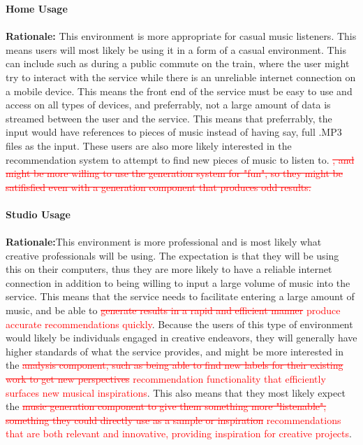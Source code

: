 \documentclass[12pt]{article}
\begin{document}
\textbf{Home Usage}\\
\\\textbf{Rationale:} This environment is more appropriate for casual music listeners. 
This means users will most likely be using it in a form of a casual environment. This can 
include such as during a public commute on the train, where the user might try to interact 
with the service while there is an unreliable internet connection on a mobile device. This
means the front end of the service must be easy to use and access on all types of devices, 
and preferrably, not a large amount of data is streamed between the user and the service. 
This means that preferrably, the input would have references to pieces of music instead of 
having say, full .MP3 files as the input. These users are also more likely interested in the 
recommendation system to attempt to find new pieces of music to listen to. \textcolor{red}{\sout{, and might be more
willing to use the generation system for "fun", so they might be satifisfied even with a 
generation component that produces odd results.}}
 \\ \\
\textbf{Studio Usage}
\\
\\\textbf{Rationale:}This environment is more professional and is most likely what creative professionals will be using. 
The expectation is that they will be using this on their computers, thus they are more likely to have a reliable internet 
connection in addition to being willing to input a large volume of music into the service. This means that the service needs 
to facilitate entering a large amount of music, and be able to \textcolor{red}{\sout{generate results in a rapid and efficient manner}} 
\textcolor{red}{produce accurate recommendations quickly}. Because the users of this type of environment would likely be individuals 
engaged in creative endeavors, they will generally have higher standards of what the service provides, and might be more interested in 
the \textcolor{red}{\sout{analysis component, such as being able to find new labels for their existing work to get new perspectives}} 
\textcolor{red}{recommendation functionality that efficiently surfaces new musical inspirations}. This also means that they most likely 
expect the \textcolor{red}{\sout{music generation component to give them something more "listenable", something they could directly use 
as a sample or inspiration}} \textcolor{red}{recommendations that are both relevant and innovative, providing inspiration for creative projects}.
\end{document}
